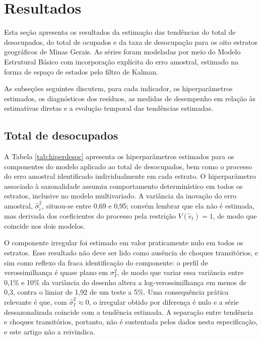 \documentclass[rbe,wwwview]{econbr}
\begin{document}
\section{Resultados}
\label{sec:resultados}

Esta seção apresenta os resultados da estimação das tendências do total de desocupados, do total de ocupados e da taxa de desocupação para os oito estratos geográficos de Minas Gerais. As séries foram modeladas por meio do Modelo Estrutural Básico com incorporação explícita do erro amostral, estimado na forma de espaço de estados pelo filtro de Kalman.

As subseções seguintes discutem, para cada indicador, os hiperparâmetros estimados, os diagnósticos dos resíduos, as medidas de desempenho em relação às estimativas diretas e a evolução temporal das tendências estimadas.

\subsection{Total de desocupados}

A Tabela \ref{tab:hiperdesoc} apresenta os hiperparâmetros estimados para os componentes do modelo aplicado ao total de desocupados, bem como o processo do erro amostral identificado individualmente em cada estrato. O hiperparâmetro associado à sazonalidade assumiu comportamento determinístico em todos os estratos, inclusive no modelo multivariado. A variância da inovação do erro amostral, \(\hat{\sigma}_{\tilde{e}}^2\), situou-se entre 0,69 e 0,95; convém lembrar que ela não é estimada, mas derivada dos coeficientes do processo pela restrição \(V(\tilde{e}_t)=1\), de modo que coincide nos dois modelos.

O componente irregular foi estimado em valor praticamente nulo em todos os estratos. Esse resultado não deve ser lido como ausência de choques transitórios, e sim como reflexo da fraca identificação do componente: o perfil de verossimilhança é quase plano em \(\sigma_I^2\), de modo que variar essa variância entre 0,1\% e 10\% da variância do desenho altera a log-verossimilhança em menos de 0,3, contra o limiar de 1,92 de um teste a 5\%. Uma consequência prática relevante é que, com \(\hat{\sigma}_I^2 \approx 0\), o irregular obtido por diferença é nulo e a série dessazonalizada coincide com a tendência estimada. A separação entre tendência e choques transitórios, portanto, não é sustentada pelos dados nesta especificação, e este artigo não a reivindica.

\vspace{-0.3cm}

\vspace{-0.7cm}
\end{document}
